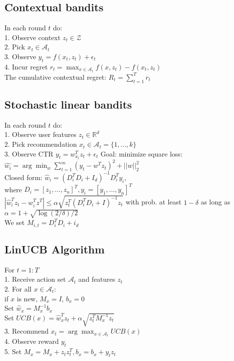 \subsection*{Contextual bandits}
In each round $t$ do:\\
1. Observe context $z_t \in \mathcal{Z}$\\
2. Pick $x_t \in \mathcal{A}_t$\\
3. Observe $y_t = f(x_t, z_t) + \epsilon_t$\\
4. Incur regret $r_t = \max_{x \in \mathcal{A}_t} f(x,z_t) - f(x_t, z_t)$\\
The cumulative contextual regret: $R_t = \sum_{t=1}^T r_t$

\subsection*{Stochastic linear bandits}
In each round $t$ do:\\
1. Observe user features $z_t \in \mathbb{R}^d$\\
2. Pick recommendation $x_t \in \mathcal{A}_t = \{1,..., k\}$\\
3. Observe CTR $y_t = w^T_{x_t} z_t + \epsilon_t$
Goal: minimize square loss:\\
$\hat{w_i} = \arg \min_w \sum_{t=1}^m (y_t - w^T z_t)^2 + ||w||_2^2$\\
Closed form: $\hat{w}_i = (D_i^T D_i + I_d)^{-1} D_i^T y_i$,\\
where $D_i = [z_1, \dots, z_n]^T, y_i = [y_1, \dots, y_n]^T$\\
$| \hat{w}_i^T z_t - w_i^T z^T| \leq \alpha \sqrt{z_t^T(D_i^TD_i+I)^{-1}z_t}$
with prob. at least $1-\delta$ as long as $\alpha = 1 + \sqrt{\log(2/\delta)/2}$\\
We set $M_{i,t} = D_i^T D_i + i_d$

\subsection*{LinUCB Algorithm}
For $t=1:T$\\
1. Receive action set $\mathcal{A}_t$ and features $z_t$\\
2. For all $x \in \mathcal{A}_t$:\\
if $x$ is new, $M_x = I$, $b_x = 0$\\
Set $\hat{w}_x = M_x^{-1} b_x$\\
Set $UCB(x) = \hat{w}_x^T z_t + \alpha\sqrt{z_t^T M_x^{-1} z_t}$\\
3. Recommend $x_t = \arg \max_{x\in \mathcal{A}_t} UCB(x)$\\
4. Observe reward $y_t$\\
5. Set $M_x =M_x + z_tz_t^T, b_x = b_x + y_t z_t$

